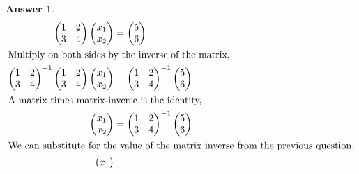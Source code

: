 \documentclass{article}
\newtheorem{answer}{Answer}
\begin{document}
\begin{answer}
  \begin{align}
    \begin{pmatrix}
      1 & 2 \\
      3 & 4
    \end{pmatrix}
    \begin{pmatrix}
      x_1 \\
      x_2
    \end{pmatrix}
    &= 
    \begin{pmatrix}
      5 \\ 6
    \end{pmatrix}\\
    \intertext{Multiply on both sides by the inverse of the matrix,}
    \begin{pmatrix}
      1 & 2 \\
      3 & 4
    \end{pmatrix}^{-1}
    \begin{pmatrix}
      1 & 2 \\
      3 & 4
    \end{pmatrix}
    \begin{pmatrix}
      x_1 \\
      x_2
    \end{pmatrix}
    &= 
    \begin{pmatrix}
      1 & 2 \\
      3 & 4
    \end{pmatrix}^{-1}
    \begin{pmatrix}
      5 \\ 6
    \end{pmatrix}\\
    \intertext{A matrix times matrix-inverse is the identity,}
    \begin{pmatrix}
      x_1 \\
      x_2
    \end{pmatrix}
    &= 
    \begin{pmatrix}
      1 & 2 \\
      3 & 4
    \end{pmatrix}^{-1}
    \begin{pmatrix}
      5 \\ 6
    \end{pmatrix}\\
    \intertext{We can substitute for the value of the matrix inverse from the previous question,}
    \begin{pmatrix}
      x_1 \\

\end{pmatrix}
\end{align}
\end{answer}
\end{document}

